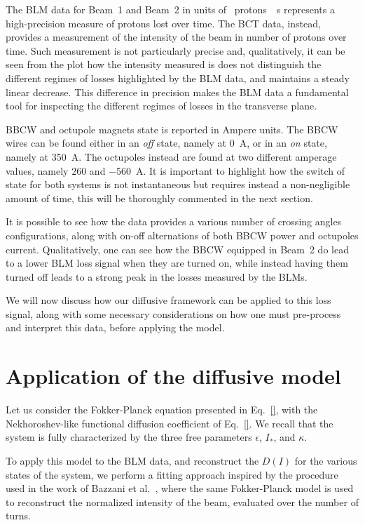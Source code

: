 The BLM data for Beam~1 and Beam~2 in units of \SI{}{protons \per s} represents a high-precision measure of protons lost over time. The BCT data, instead, provides a measurement of the intensity of the beam in number of protons over time. Such measurement is not particularly precise and, qualitatively, it can be seen from the plot how the intensity measured is does not distinguish the different regimes of losses highlighted by the BLM data, and maintains a steady linear decrease. This difference in precision makes the BLM data a fundamental tool for inspecting the different regimes of losses in the transverse plane.  

BBCW and octupole magnets state is reported in Ampere units. The BBCW wires can be found either in an \textit{off} state, namely at \SI{0}{\ampere}, or in an \textit{on} state, namely at \SI{350}{\ampere}. The octupoles instead are found at two different amperage values, namely $260$ and \SI{-560}{\ampere}. It is important to highlight how the switch of state for both systems is not instantaneous but requires instead a non-negligible amount of time, this will be thoroughly commented in the next section.

It is possible to see how the data provides a various number of crossing angles configurations, along with on-off alternations of both BBCW power and octupoles current. Qualitatively, one can see how the BBCW equipped in Beam~2 do lead to a lower BLM loss signal when they are turned on, while instead having them turned off leads to a strong peak in the losses measured by the BLMs.

We will now discuss how our diffusive framework can be applied to this loss signal, along with some necessary considerations on how one must pre-process and interpret this data, before applying the model. 

\section{Application of the diffusive model}

Let us consider the Fokker-Planck equation presented in Eq.~\eqref{}, with the Nekhoroshev-like functional diffusion coefficient of Eq.~\eqref{}. We recall that the system is fully characterized by the three free parameters $\epsilon$, $I_\ast$, and $\kappa$.

To apply this model to the BLM data, and reconstruct the $D(I)$ for the various states of the system, we perform a fitting approach inspired by the procedure used in the work of Bazzani et al.~\cite{bazzani2020diffusion}, where the same Fokker-Planck model is used to reconstruct the normalized intensity of the beam, evaluated over the number of turns.

